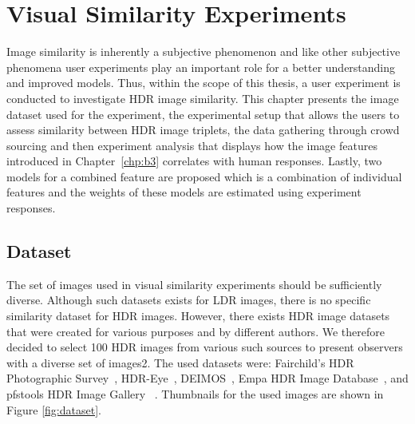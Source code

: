 \chapter{Visual Similarity Experiments}
\label{chp:b5}

Image similarity is inherently a subjective phenomenon and like other subjective phenomena user experiments play an important role for a better understanding and improved models. Thus, within the scope of this thesis, a user experiment is conducted to investigate HDR image similarity. This chapter presents the image dataset used for the experiment, the experimental setup that allows the users to assess similarity between HDR image triplets, the data gathering through crowd sourcing and then experiment analysis that displays how the image features introduced in Chapter~\ref{chp:b3} correlates with human responses. Lastly, two models for a combined feature are proposed which is a combination of individual features and the weights of these models are estimated using experiment responses.

\section{Dataset}

The set of images used in visual similarity experiments should be sufficiently diverse. Although such datasets exists for LDR images, there is no specific similarity dataset for HDR images. However, there exists HDR image datasets that were created for various purposes and by different authors. We therefore decided to select 100 HDR images from various such sources to present observers with a diverse set of images2. The used datasets were: Fairchild’s HDR Photographic Survey~\cite{fairchild2007hdr}, HDR-Eye~\cite{nemoto2015visual}, DEIMOS~\cite{klima2011deimos}, Empa HDR Image Database~\cite{EmpaHDR}, and pfstools HDR Image Gallery ~\cite{mantiuk2007high}. Thumbnails for the used images are shown in Figure \ref{fig:dataset}.


